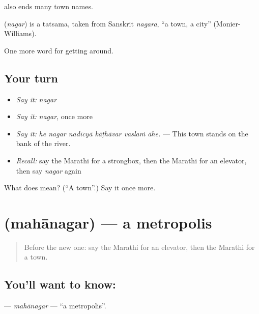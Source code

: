  also ends many town names.

\begin{cousinweb}
\textbf{} (\emph{nagar}) is a tatsama, taken from Sanskrit \emph{nagara}, \textquotedblleft{}a town, a city\textquotedblright{} (Monier-Williams).
\end{cousinweb}

\begin{grammarlens}[title={What you've built}]
One more word for getting around.
\end{grammarlens}

\subsection*{Your turn}
\begin{itemize}
\raggedright
  \item \emph{Say it:} \emph{nagar}
  \item \emph{Say it:} \emph{nagar}, once more
  \item \emph{Say it:} \emph{he nagar nadīcyā kāṭhāvar vaslaṁ āhe.} — This town stands on the bank of the river.
  \item \emph{Recall:} say the Marathi for a strongbox, then the Marathi for an elevator, then say \emph{nagar} again
\end{itemize}

\begin{tcolorbox}[breakable,colback=teal!4,colframe=teal!35!black,title={Before you move on}]
What does  mean? (\textquotedblleft{}A town\textquotedblright{}.) Say it once more.
\end{tcolorbox}
\section[\texorpdfstring{\mr{महानगर} (mahānagar)}{महानगर (mahānagar)}]{ (mahānagar) — a metropolis}

\label{lesson:MR-C418-mahanagar}



\begin{quote}
Before the new one: say the Marathi for an elevator, then the Marathi for a town.
\end{quote}

\subsection*{You'll want to know: }
\textbf{} — \emph{mahānagar} — \textquotedblleft{}a metropolis\textquotedblright{}.

